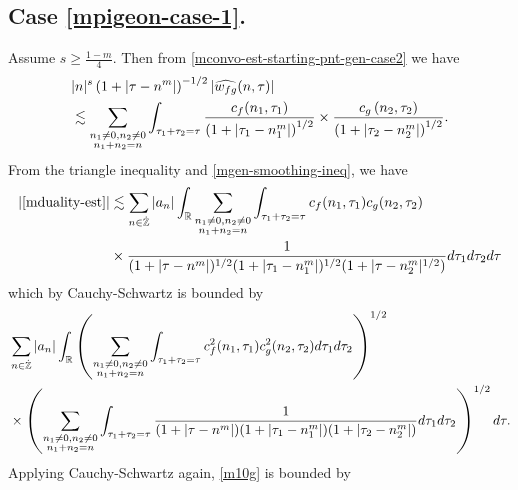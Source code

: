 \subsection{Case \texorpdfstring{\eqref{mpigeon-case-1}}{1}.} Assume $s \ge \frac{1-m}{4}$. Then from 
\eqref{mconvo-est-starting-pnt-gen-case2} we have
%
%
\begin{equation}
	\label{mgen-smoothing-ineq}
	\begin{split}
		& |n|^s \left( 1 + | \tau - n^m | \right)^{-1/2} | 
		\widehat{w_{fg}}(n, \tau) | 
		\\
		& \lesssim \sum_{\substack{n_1 \neq0, n_2 \neq 0 \\n_1 + n_2 =n}} \int_{\tau_1 + \tau_2 = \tau}\frac{c_f(n_1, \tau_1)}{\left( 1 + | 
		\tau_1 -  n_1^m| \right)^{1/2}}
		\times \frac{c_g\left( n_2, \tau_2\right)}{\left( 1 + | \tau_2 -n_2^m|
		\right)^{1/2}}.
	\end{split}
\end{equation}
%
%
From the triangle inequality and \eqref{mgen-smoothing-ineq}, we have
%
%
\begin{equation*}
	\begin{split}
	 |\eqref{mduality-est}|
	& \lesssim \sum_{n \in \dot{\mathbb{Z}}} |a_{n}| \int_{\mathbb{R}} \sum_{\substack{n_1 \neq 0, n_2 \neq 0
		\\ n_1 +n_2 =n}} \int_{\tau_1 + \tau_2 = \tau} c_f(n_1, \tau_1)
		c_g(n_2, \tau_2)
		\\
		& \times \frac{1}{(1 + | \tau - n^m |)^{1/2}(1 + |
		\tau_{1}-n_{1}^m |)^{1/2}(1 + | \tau-n_{2}^m |^{1/2})} d \tau_1 d \tau_2
		d \tau
	\end{split}
\end{equation*}
%
%
which by Cauchy-Schwartz is bounded by
%
%
\begin{equation}
	\label{m10g}
	\begin{split}
		& \sum_{n \in \dot{\mathbb{Z}}} |a_n| \int_{\mathbb{R}} \left(  \sum_{\substack{n_1 \neq 0, n_2
		\neq 0 \\n_1 +n_2 =n}} \int_{\tau_1 + \tau_2 = \tau} c_{f}^{2}(n_1, \tau_1)
		c_{g}^{2} (n_2, \tau_2) d \tau_1 d \tau_2 \right)^{1/2} 
		\\
		& \times \left( \sum_{\substack{n_1 \neq 0, n_2 \neq 0 \\n_1 +n_2 =n}}
		\int_{\tau_1 + \tau_2 = \tau} \frac{1}{(1 + | \tau - n^m |)(1 + | \tau_{1}-n_{1}^m |)(1 + |
		\tau_2 -n_{2}^m |)} d \tau_1 d \tau_2
		\right)^{1/2} d \tau.
	\end{split}
\end{equation}
%
%
Applying Cauchy-Schwartz again, \eqref{m10g} is bounded by
